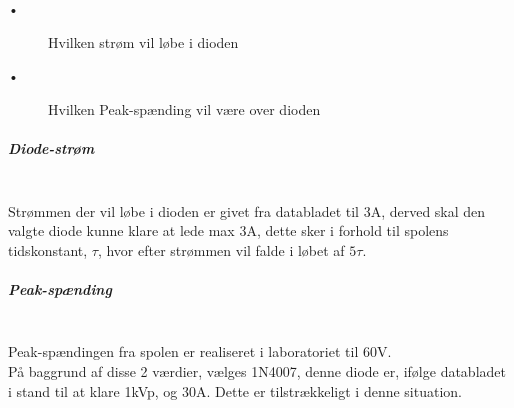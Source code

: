 \begin{description}
 \item[•] Hvilken strøm vil løbe i dioden
 \item[•] Hvilken Peak-spænding vil være over dioden
\end{description}

\subparagraph{Diode-strøm} \hspace{0pt} \\
Strømmen der vil løbe i dioden er givet fra databladet til  3A, derved skal den valgte diode kunne klare at lede max 3A, dette sker i forhold til spolens tidskonstant, $\tau$, hvor efter strømmen vil falde i løbet af $ 5 \tau$.

\subparagraph{Peak-spænding} \hspace{0pt} \\
Peak-spændingen fra spolen er realiseret i laboratoriet til 60V. \\ 

På baggrund af disse 2 værdier, vælges 1N4007, denne diode er, ifølge databladet i stand til at klare 1kVp, og 30A. Dette er tilstrækkeligt i denne situation.
